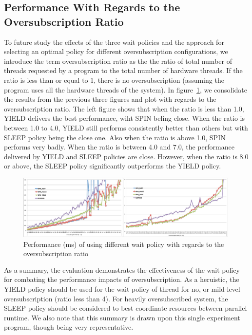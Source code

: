 \subsection{Performance With Regards to the Oversubscription Ratio}
To future study the effects of the three wait policies and the approach for selecting an optimal policy for different
oversubscription configurations, we introduce the term oversubscription ratio as the the ratio of total number of
threads requested by a program to the total number of hardware threads. If the ratio is less than or equal to 1,
there is no oversubscription (assuming the program uses all the hardware threads of the system). 
In figure~\ref{fig:ovratio}, we consolidate the results from the previous three figures and plot with regards to 
the oversubscription ratio. The left figure shows that when the ratio is less than 1.0, YIELD delivers the
best performance, wiht SPIN beling close. When the ratio is between 1.0 to 4.0, YIELD still performs consistently
better than others but with SLEEP policy being the close one. Also when the ratio is above 1.0, SPIN performs very
badly. When the ratio is between 4.0 and 7.0, the performance delivered by YIELD and SLEEP policies are close. 
However, when the ratio is 8.0 or above, the SLEEP policy significantly outperforms the YIELD policy. 
\begin{figure}[h]
    \includegraphics[width=0.99\textwidth] {images/ovratio}
    \caption{Performance (ms) of using different wait policy with regards to the oversubscription ratio}
    \label{fig:ovratio}
\end{figure}

As a summary, the evaluation demonstrates the effectiveness of the wait policy for combating the performance 
impacts of oversubscription. As a heruistic, the YIELD policy should be used for the wait policy of thread for no, or mild-level oversubscription (ratio less than 4). For heavily oversubscribed system, the SLEEP policy should be 
considered to best coordinate resources between parallel runtime. We also note that this summary is drawn upon this
single experiment program, though being very representative. 

